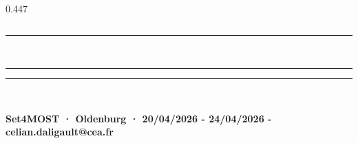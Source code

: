 \documentclass[final]{beamer}
\begin{document}
\begin{frame}[t]{}
\begin{columns}[T]
\begin{column}{0.447\linewidth}
  \end{column}

\end{columns}

\vspace{0.5cm}
\noindent\textcolor{RougeF}{\rule{\linewidth}{2pt}}\\[-2pt]
\noindent\textcolor{Rouge}{\rule{\linewidth}{6pt}}


\vspace{0.3cm}
\noindent\textcolor{RougeF}{\rule{\linewidth}{2pt}}\\[-2pt]
\noindent\colorbox{Rouge}{%
  \begin{minipage}{\linewidth}
    \vspace{0.3cm}
    \centering
    {\color{white}\large\bfseries Set4MOST · Oldenburg · 20/04/2026 - 24/04/2026 - \normalsize celian.daligault@cea.fr}\\[0.2cm]
    \vspace{0.2cm}
  \end{minipage}%
}


\end{frame}
\end{document}

